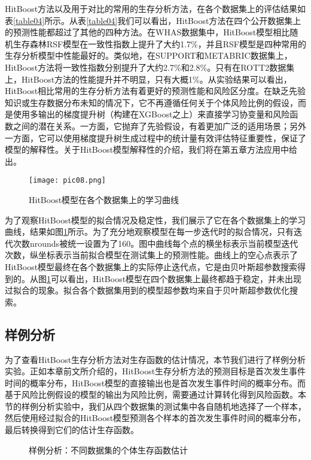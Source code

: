 HitBoost方法以及用于对比的常用的生存分析方法，在各个数据集上的评估结果如表\ref{table04}所示。从表\ref{table04}我们可以看出，HitBoost方法在四个公开数据集上的预测性能都超过了其他的四种方法。在WHAS数据集中，HitBoost模型相比随机生存森林RSF模型在一致性指数上提升了大约1.7\%，并且RSF模型是四种常用的生存分析模型中性能最好的。类似地，在SUPPORT和METABRIC数据集上，HitBoost方法将一致性指数分别提升了大约2.7\%和2.8\%。只有在ROTT2数据集上，HitBoost方法的性能提升并不明显，只有大概1\%。从实验结果可以看出，HitBoost相比常用的生存分析方法有着更好的预测性能和风险区分度。在缺乏先验知识或生存数据分布未知的情况下，它不再遵循任何关于个体风险比例的假设，而是使用多输出的梯度提升树（构建在XGBoost之上）来直接学习协变量和风险函数之间的潜在关系。一方面，它抛弃了先验假设，有着更加广泛的适用场景；另外一方面，它可以使用梯度提升树生成过程中的统计量有效评估特征重要性，保证了模型的解释性。关于HitBoost模型解释性的介绍，我们将在第五章方法应用中给出。

\begin{figure}[H]
\texttt{[image: pic08.png]}
\caption{HitBoost模型在各个数据集上的学习曲线}
\label{pic08}
\end{figure}

为了观察HitBoost模型的拟合情况及稳定性，我们展示了它在各个数据集上的学习曲线，结果如图\ref{pic08}所示。为了充分地观察模型在每一步迭代时的拟合情况，只有迭代次数nrounds被统一设置为了160。图中曲线每个点的横坐标表示当前模型迭代次数，纵坐标表示当前拟合模型在测试集上的预测性能。曲线上的空心点表示了HitBoost模型最终在各个数据集上的实际停止迭代点，它是由贝叶斯超参数搜索得到的。从图\ref{pic08}可以看出，HitBoost模型在四个数据集上最终都趋于稳定，并未出现过拟合的现象。拟合各个数据集用到的模型超参数均来自于贝叶斯超参数优化搜索。

\subsection{样例分析}

为了查看HitBoost生存分析方法对生存函数的估计情况，本节我们进行了样例分析实验。正如本章前文所介绍的，HitBoost生存分析方法的预测目标是首次发生事件时间的概率分布，HitBoost模型的直接输出也是首次发生事件时间的概率分布。而基于风险比例假设的模型的输出为风险比例，需要通过计算转化得到风险函数。本节的样例分析实验中，我们从四个数据集的测试集中各自随机地选择了一个样本，然后使用经过拟合的HitBoost模型预测各个样本的首次发生事件时间的概率分布，最后转换得到它们的估计生存函数。
\begin{figure}[h]
\centering 
{}
\hspace{0.01\linewidth}
\vfill
{}
\hspace{0.01\linewidth}
\caption{样例分析：不同数据集的个体生存函数估计}
\label{pic09}
\end{figure}

